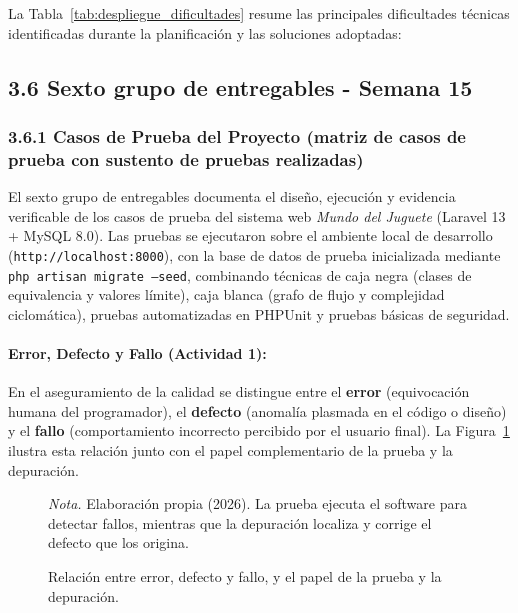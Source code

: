 \documentclass[12pt,a4paper]{article}
\begin{document}
La Tabla~\ref{tab:despliegue_dificultades} resume las principales dificultades técnicas identificadas durante la planificación y las soluciones adoptadas:



\subsection{3.6 Sexto grupo de entregables - Semana 15}

\subsubsection{3.6.1 Casos de Prueba del Proyecto (matriz de casos de prueba con sustento de pruebas realizadas)}

El sexto grupo de entregables documenta el diseño, ejecución y evidencia verificable de los casos de prueba del sistema web \textit{Mundo del Juguete} (Laravel 13 + MySQL 8.0). Las pruebas se ejecutaron sobre el ambiente local de desarrollo (\texttt{http://localhost:8000}), con la base de datos de prueba inicializada mediante \texttt{php artisan migrate --seed}, combinando técnicas de caja negra (clases de equivalencia y valores límite), caja blanca (grafo de flujo y complejidad ciclomática), pruebas automatizadas en PHPUnit y pruebas básicas de seguridad.

\paragraph{Error, Defecto y Fallo (Actividad 1):}
En el aseguramiento de la calidad se distingue entre el \textbf{error} (equivocación humana del programador), el \textbf{defecto} (anomalía plasmada en el código o diseño) y el \textbf{fallo} (comportamiento incorrecto percibido por el usuario final). La Figura~\ref{fig:pruebas_error_defecto} ilustra esta relación junto con el papel complementario de la prueba y la depuración.

\begin{figure}[H]
  \caption{Relación entre error, defecto y fallo, y el papel de la prueba y la depuración.}
  \label{fig:pruebas_error_defecto}
  \centering
  \resizebox{\linewidth}{!}{}
  \par\vspace{1ex}
  \raggedright\noindent\small \emph{Nota.} Elaboración propia (2026). La prueba ejecuta el software para detectar fallos, mientras que la depuración localiza y corrige el defecto que los origina.
\end{figure}
\end{document}
